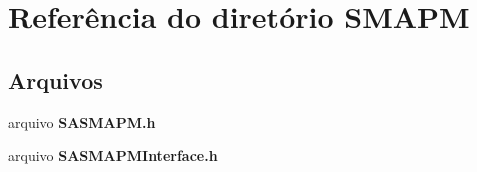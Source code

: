 \section{Referência do diretório S\+M\+A\+PM}
\label{dir_bf59d9113fc71fe37a793c2cc065fdd8}
\subsection*{Arquivos}
\begin{DoxyCompactItemize}
\item 
arquivo {\bf S\+A\+S\+M\+A\+P\+M.\+h}
\item 
arquivo {\bf S\+A\+S\+M\+A\+P\+M\+Interface.\+h}
\end{DoxyCompactItemize}
